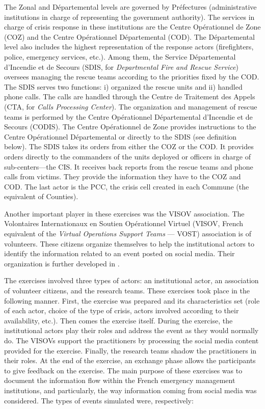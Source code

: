 The Zonal and Départemental levels are governed by Préfectures (administrative institutions in charge of representing the government authority).
The services in charge of crisis response in these institutions are the Centre Opérationnel de Zone (COZ) and the Centre Opérationnel Départemental (COD).
The Départemental level also includes the highest representation of the response actors (firefighters, police, emergency services, etc.).
Among them, the Service Départemental d'Incendie et de Secours (SDIS, for \textit{Departmental Fire and Rescue Service}) oversees managing the rescue teams according to the priorities fixed by the COD.
The SDIS serves two functions: i) organized the rescue units and ii) handled phone calls.
The calls are handled through the Centre de Traitement des Appels (CTA, for \textit{Calls Processing Center}).
The organization and management of rescue teams is performed by the Centre Opérationnel Départemental d’Incendie et de Secours (CODIS).
The Centre Opérationnel de Zone provides instructions to the Centre Opérationnel Départemental or directly to the SDIS (see definition below).
The SDIS takes its orders from either the COZ or the COD.
It provides orders directly to the commanders of the units deployed or officers in charge of sub-centers—the CIS.
It receives back reports from the rescue teams and phone calls from victims.
They provide the information they have to the COZ and COD.
The last actor is the PCC, the crisis cell created in each Commune (the equivalent of Counties).

Another important player in these exercises was the VISOV association.
The Volontaires Internationaux en Soutien Opérationnel Virtuel (VISOV, French equivalent of the \textit{Virtual Operations Support Teams} — VOST) association is of volunteers.
These citizens organize themselves to help the institutional actors to identify the information related to an event posted on social media.
Their organization is further developed in \textcite[p.122--148]{batardIntegrerContributionsCitoyennes2021}.

The exercises involved three types of actors: an institutional actor, an association of volunteer citizens, and the research teams.
These exercises took place in the following manner.
First, the exercise was prepared and its characteristics set (role of each actor, choice of the type of crisis, actors involved according to their availability, etc.).
Then comes the exercise itself.
During the exercise, the institutional actors play their roles and address the event as they would normally do.
The VISOVs support the practitioners by processing the social media content provided for the exercise.
Finally, the research teams shadow the practitioners in their roles.
At the end of the exercise, an exchange phase allows the participants to give feedback on the exercise.
The main purpose of these exercises was to document the information flow within the French emergency management institutions, and particularly, the way information coming from social media was considered.
The types of events simulated were, respectively:

